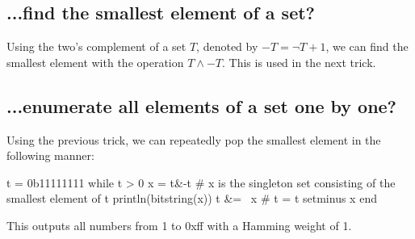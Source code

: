 \subsection{...find the smallest element of a set?}
Using the two's complement of a set $T$, denoted by $-T = \lnot T+1$, we can find the smallest element with the operation $T\land -T$. This is used in the next trick.

\subsection{...enumerate all elements of a set one by one?}
Using the previous trick, we can repeatedly pop the smallest element in the following manner:
\begin{jllisting}
  t = 0b11111111
  while t > 0
    x = t&-t  # x is the singleton set consisting of the smallest element of t
    println(bitstring(x))
    t &= ~x   # t = t setminus x
  end
\end{jllisting}
This outputs all numbers from 1 to 0xff with a Hamming weight of 1.